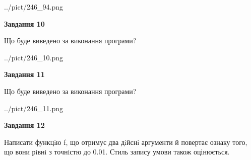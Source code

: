\documentclass[12pt, ukrainian]{article}
\begin{document}
{\begin {large}
\begin{center}
	{../pict/246_94.png}
\end{center}
\newpage

{\begin {center}\textbf{Завдання 10}\end {center}}

Що буде виведено за виконання програми?\par
\begin{center}
	{../pict/246_10.png}
\end{center}
\newpage

{\begin {center}\textbf{Завдання 11}\end {center}}

Що буде виведено за виконання програми?\par
\begin{center}
	{../pict/246_11.png}
\end{center}
\newpage

{\begin {center}\textbf{Завдання 12}\end {center}}


Написати функцiю f, що отримує два дiйснi аргументи й повертає ознаку того, що вони рiвнi з точнiстю до 0.01. Стиль запису умови також оцінюється.\par
\newpage

\end {large}}
\end{document}

